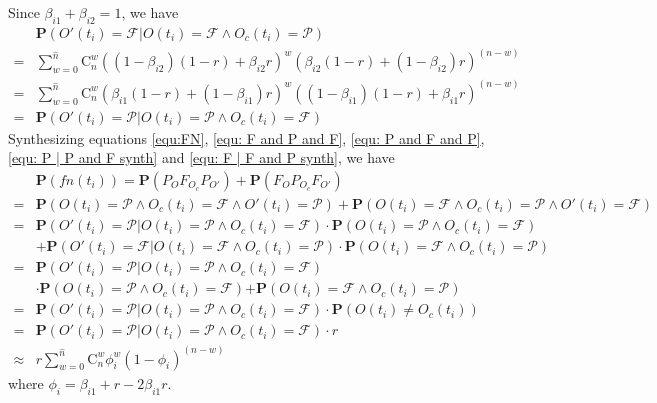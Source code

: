 Since $\beta_{i1} + \beta_{i2} = 1$, we have
\begin{equation}
\label{equ: F | F and P synth}
\begin{aligned}
& \mathbf{P}(O'(t_i) = \mathcal{F} | O(t_i) = \mathcal{F} \wedge O_c(t_i) = \mathcal{P}) \\
= & \sum_{w = 0}^{\hat{n}} {\mathrm{C}_n^w{((1-\beta_{i2})(1-r) + \beta_{i2} r)}^w} {{(\beta_{i2} (1 - r) + (1- \beta_{i2})r)}^{(n - w)}} \\
= & \sum_{w = 0}^{\hat{n}}\mathrm{C}_n^w {(\beta_{i1}(1-r) + (1 - \beta_{i1}) r)}^w 
				 { {((1 - \beta_{i1}) (1 - r) + \beta_{i1} r)}^{(n - w)}} \\
= & \mathbf{P}(O'(t_i) = \mathcal{P} | O(t_i) = \mathcal{P} \wedge O_c(t_i) = \mathcal{F})
\end{aligned}
\end{equation}
Synthesizing equations \ref{equ:FN}, \ref{equ: F and P and F}, \ref{equ: P and F and P}, \ref{equ: P | P and F synth} and \ref{equ: F | F and P synth}, we have
\begin{equation}
\begin{aligned}
& \mathbf{P}(fn(t_i))= \mathbf{P}(P_O F_{O_c} P_{O'}) + \mathbf{P}(F_O P_{O_c} F_{O'}) \\
= & \mathbf{P}(O(t_i) = \mathcal{P} \wedge O_c(t_i) = \mathcal{F} \wedge O'(t_i) = \mathcal{P}) + \mathbf{P}(O(t_i) = \mathcal{F} \wedge O_c(t_i) = \mathcal{P} \wedge O'(t_i) = \mathcal{F}) \\
= & \mathbf{P}(O'(t_i) = \mathcal{P} | O(t_i) = \mathcal{P} \wedge O_c(t_i) = \mathcal{F}) \cdot \mathbf{P}(O(t_i) = \mathcal{P} \wedge O_c(t_i) = \mathcal{F}) \\
& + \mathbf{P}(O'(t_i) = \mathcal{F} | O(t_i) = \mathcal{F} \wedge O_c(t_i) = \mathcal{P}) \cdot \mathbf{P}(O(t_i) = \mathcal{F} \wedge O_c(t_i) = \mathcal{P}) \\
= & \mathbf{P}(O'(t_i) = \mathcal{P} | O(t_i) = \mathcal{P} \wedge O_c(t_i) = \mathcal{F}) \\
&\cdot {\mathbf{P}(O(t_i) = \mathcal{P} \wedge O_c(t_i) = \mathcal{F})} { +\mathbf{P}(O(t_i) = \mathcal{F} \wedge O_c(t_i) = \mathcal{P})} \\
= & \mathbf{P}(O'(t_i) = \mathcal{P} | O(t_i) = \mathcal{P} \wedge O_c(t_i) = \mathcal{F}) \cdot \mathbf{P}(O(t_i) \ne O_c(t_i)) \\
= & \mathbf{P}(O'(t_i) = \mathcal{P} | O(t_i) = \mathcal{P} \wedge O_c(t_i) = \mathcal{F}) \cdot r \\
\approx & r \sum_{w = 0}^{\hat{n}}{\mathrm{C}_n^w{\phi_i^w (1-\phi_i)^{(n-w)}}}
\end{aligned}
\end{equation}
where $\phi_i = \beta_{i1} + r - 2\beta_{i1} r$.

